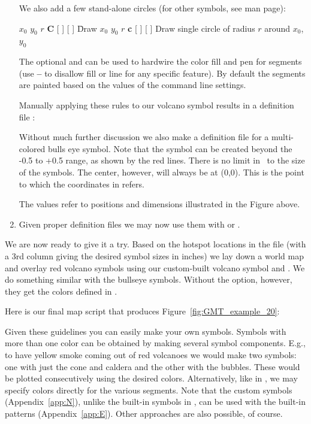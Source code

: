 \begin{enumerate}
We also add a few stand-alone circles (for other symbols, see  man page):

\begin{tabbing} 
$x_0$ $y_0$ $r$ {\bf C} [  ] [  ] \=Draw \kill
$x_0$ $y_0$ $r$ {\bf c} [  ] [  ] \> Draw
single circle of radius $r$ around $x_0$, $y_0$ \\
\end{tabbing} 

The optional  and  can be used to hardwire
the color fill and pen for segments (use {\bf --} to disallow
fill or line for any specific feature).  By default the segments
are painted based on the values of the command line settings.

Manually applying these rules to our volcano symbol results in a
definition file :


Without much further discussion we also make a definition file  for a multi-colored bulls eye symbol.
Note that the symbol can be created beyond the -0.5 to +0.5 range, as shown by the red lines. There is no limit in
\GMT\ to the size of the symbols. The center, however, will always be at (0,0). This is the point to which the
coordinates in  refers.


The values refer to positions and dimensions illustrated in the Figure above.

\item Given proper definition files we may now use them with  or .
\end{enumerate}

We are now ready to give it a try.  Based on the hotspot
locations in the file  (with a 3rd column
giving the desired symbol sizes in inches) we lay down a
world map and overlay red volcano symbols using our custom-built
volcano symbol and . We do something similar with the bullseye symbols.
Without the  option, however, they get the colors defined in .

Here is our final map script that produces Figure~\ref{fig:GMT_example_20}:


Given these guidelines you can easily make your own symbols.
Symbols with more than one color can be obtained by making
several symbol components.  E.g., to have yellow smoke coming
out of red volcanoes we would make two symbols: one with just
the cone and caldera and the other with the bubbles.  These
would be plotted consecutively using the desired colors.
Alternatively, like in , we may
specify colors directly for the various segments.  Note that
the custom symbols (Appendix~\ref{app:N}), unlike the built-in symbols in \GMT, can
be used with the built-in patterns (Appendix~\ref{app:E}).  Other
approaches are also possible, of course.

